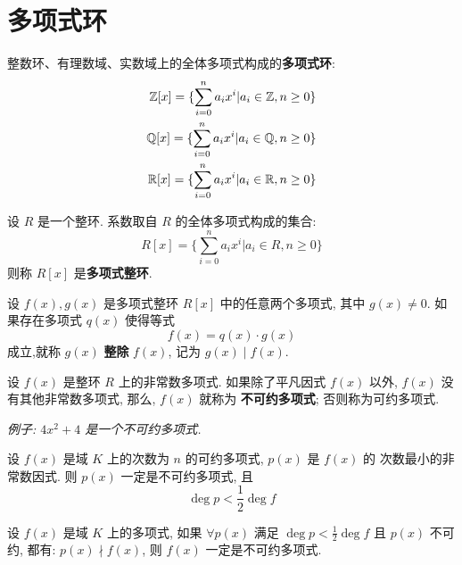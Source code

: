 \section{多项式环}

\begin{definition}[多项式环]
    整数环、有理数域、实数域上的全体多项式构成的\textbf{多项式环}:
    \begin{align*}
        \mathbb{Z}[x] = \{\sum_{i=0}^n a_i x^i | a_i \in \mathbb{Z}, n \ge 0\} \\
        \mathbb{Q}[x] = \{\sum_{i=0}^n a_i x^i | a_i \in \mathbb{Q}, n \ge 0\} \\
        \mathbb{R}[x] = \{\sum_{i=0}^n a_i x^i | a_i \in \mathbb{R}, n \ge 0\}
    \end{align*}
\end{definition}

\begin{definition}
    设 \(R\) 是一个整环. 系数取自 \(R\) 的全体多项式构成的集合:
    \begin{equation*}
        R[x]=\{\sum_{i=0}^n a_i x^i | a_i \in R, n \ge 0\}
    \end{equation*}
    则称 \(R[x]\) 是\textbf{多项式整环}.
\end{definition}

\begin{definition}
    设 \(f(x),g(x)\) 是多项式整环 \(R[x]\) 中的任意两个多项式, 其中 \(g(x) \ne 0\).
    如果存在多项式 \(q(x)\) 使得等式 
    \[f(x) = q(x) \cdot g(x)\]
    成立,就称 \(g(x)\) \textbf{整除} \(f(x)\), 记为 \(g(x) \mid f(x)\).
\end{definition}

\begin{definition}[不可约多项式]
    设 \(f(x)\) 是整环 \(R\) 上的非常数多项式. 如果除了平凡因式 \(f(x)\) 以外,
    \(f(x)\) 没有其他非常数多项式, 那么, \(f(x)\) 就称为 \textbf{不可约多项式};
    否则称为可约多项式.
\end{definition}

\textit{例子: \(4x^2+4\) 是一个不可约多项式.}

\begin{theorem}
    设 \(f(x)\) 是域 \(K\) 上的次数为 \(n\) 的可约多项式, \(p(x)\) 是 \(f(x)\) 的
    次数最小的非常数因式. 则 \(p(x)\) 一定是不可约多项式, 且
    \[\deg p < \frac{1}{2}\deg f\]
\end{theorem}

\begin{theorem}
    设 \(f(x)\) 是域 \(K\) 上的多项式, 如果 
    \(\forall p(x)\) 满足 \(\deg p < \frac{1}{2}\deg f\)
    且 \(p(x)\) 不可约, 都有: \(p(x) \nmid f(x)\),
    则 \(f(x)\) 一定是不可约多项式.
\end{theorem}

